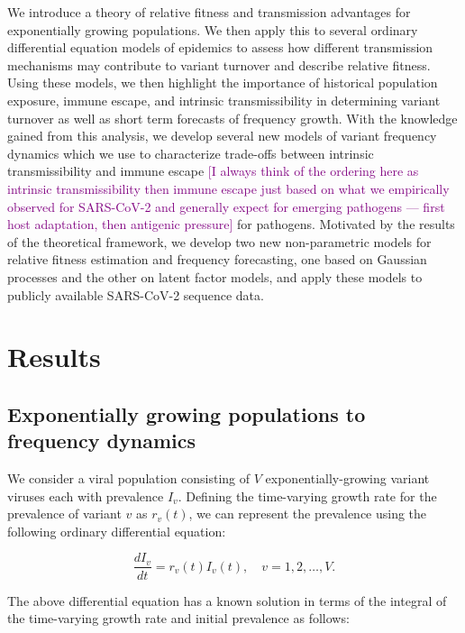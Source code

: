 \documentclass[12pt,oneside,letterpaper]{article}
\def\tbc#1{\textcolor{purple}{[#1]}}
\begin{document}
We introduce a theory of relative fitness and transmission advantages for exponentially growing populations.
We then apply this to several ordinary differential equation models of epidemics to assess how different transmission mechanisms may contribute to variant turnover and describe relative fitness.
Using these models, we then highlight the importance of historical population exposure, immune escape, and intrinsic transmissibility in determining variant turnover as well as short term forecasts of frequency growth.
With the knowledge gained from this analysis, we develop several new models of variant frequency dynamics which we use to characterize trade-offs between intrinsic transmissibility and immune escape \tbc{I always think of the ordering here as intrinsic transmissibility then immune escape just based on what we empirically observed for SARS-CoV-2 and generally expect for emerging pathogens --- first host adaptation, then antigenic pressure} for pathogens.
Motivated by the results of the theoretical framework, we develop two new non-parametric models for relative fitness estimation and frequency forecasting, one based on Gaussian processes and the other on latent factor models, and apply these models to publicly available SARS-CoV-2 sequence data.

\section*{Results}

\subsection*{Exponentially growing populations to frequency dynamics}%

We consider a viral population consisting of $V$ exponentially-growing variant viruses each with prevalence $I_{v}$.
Defining the time-varying growth rate for the prevalence of variant $v$ as $r_{v}(t)$, we can represent the prevalence using the following ordinary differential equation:

\begin{equation} \label{eq:inhomo_exp_growth}
    \frac{d I_{v}}{d t} = r_{v}(t) I_{v}(t), \quad v = 1,2, \ldots, V.
\end{equation}

The above differential equation has a known solution in terms of the integral of the time-varying growth rate and initial prevalence as follows:
\end{document}
